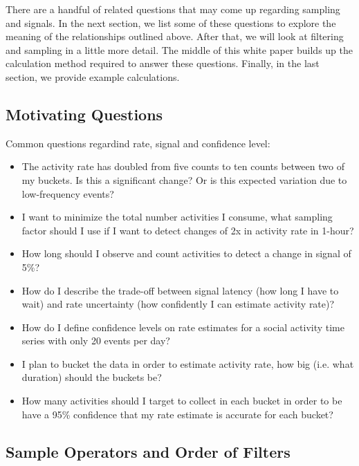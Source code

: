 \documentclass{article}
\begin{document}
There are a handful of related questions that may come up regarding sampling and signals.  In the next section, we list some of these questions to explore the meaning of the relationships outlined above. After that, we will look at filtering and sampling in a little more detail.  The middle of this white paper builds up the calculation method required to answer these questions. Finally, in the last section, we provide example calculations.

\subsection{Motivating Questions} 

Common questions regardind rate, signal and confidence level:

\begin{itemize}
	\item The activity rate has doubled from five counts to ten counts between two of my buckets. Is this a significant change? 
	Or is this expected variation due to low-frequency events?
	\item I want to minimize the total number activities I consume, what sampling factor should I use if I want to detect
	changes of 2x in activity rate in 1-hour?
	\item How long should I observe and count activities to detect a change in signal of 5\%?
	\item How do I describe the trade-off between signal latency (how long I have to wait) and rate uncertainty (how 
	confidently I can estimate activity rate)?
	\item How do I define confidence levels on rate estimates for a social activity time series with only 20 events per day?
	\item I plan to bucket the data in order to estimate activity rate, how big (i.e. what duration) should the buckets be? 
	\item How many activities should I target to collect in each bucket in order to be have a 95\% confidence that my 
	rate estimate is accurate for each bucket? 
\end{itemize}

\subsection{Sample Operators and Order of Filters} 
\end{document}
